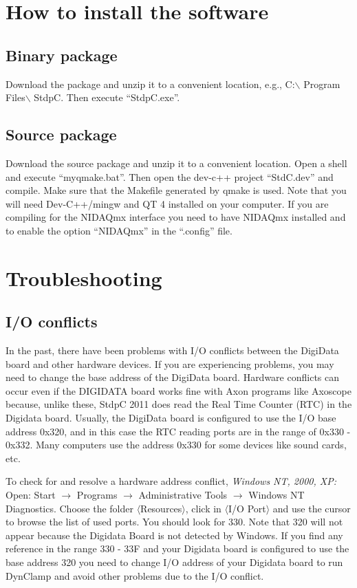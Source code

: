 \documentclass{article}
\begin{document}
\section{How to install the software}

\subsection{Binary package}
Download the package and unzip it to a convenient location, e.g.,
C:$\backslash$ Program Files$\backslash$ StdpC. Then execute ``StdpC.exe''.

\subsection{Source package}
Download the source package and unzip it to a convenient
location. Open a shell and execute ``myqmake.bat''. Then open the
dev-c++ project ``StdC.dev'' and compile. Make sure that the Makefile
generated by qmake is used. Note that you will need Dev-C++/mingw and
QT 4 installed on your computer. If you are compiling for the NIDAQmx
interface you need to have NIDAQmx installed and to enable the option
``NIDAQmx'' in the ``.config'' file.

\section{Troubleshooting}
\subsection{I/O conflicts}
 
In the past, there have been problems with I/O conflicts between the
DigiData board and other hardware devices. If you are experiencing
problems, you may need to change the base address of the DigiData
board. Hardware conflicts can occur even if the DIGIDATA board works
fine with Axon programs like Axoscope because, unlike these, StdpC
2011 does read the Real Time Counter (RTC) in the Digidata
board. Usually, the DigiData board is configured to use the I/O base
address 0x320, and in this case the RTC reading ports are in the range
of 0x330 - 0x332. Many computers use the address 0x330 for some devices like
sound cards, etc.

To check for and resolve a hardware address conflict,
\noindent
{\em Windows NT, 2000, XP: } \\
Open: Start $\rightarrow$ Programs $\rightarrow$ Administrative Tools
$\rightarrow$ Windows NT Diagnostics. Choose the folder
$\langle$Resources$\rangle$, click in $\langle$I/O Port$\rangle$ and use the
cursor to browse the list of used ports.  You should look for 330. Note that
320 will not appear because the Digidata Board is not detected by Windows. If
you find any reference in the range 330 - 33F and your Digidata board is
configured to use the base address 320 you need to change I/O address of your
Digidata board to run DynClamp and avoid other problems due to the I/O
conflict.
\end{document}
